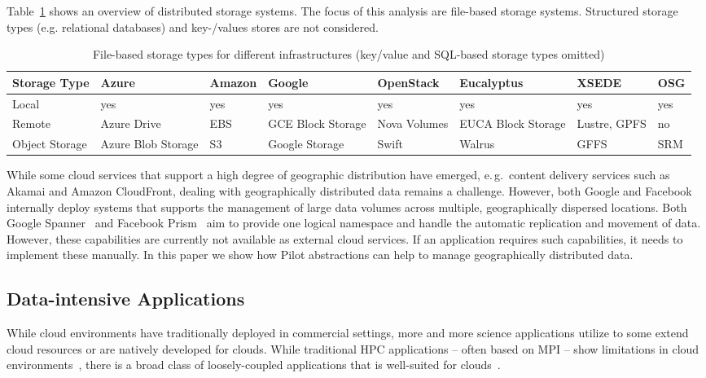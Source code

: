 \documentclass[times]{cpeauth}
\newcommand{\pilot}{Pilot\xspace}
\begin{document}
Table~\ref{tab:storage-systems} shows an overview of distributed storage 
systems. The focus of this analysis are file-based storage systems. Structured
storage types (e.g. relational databases) and key-/values stores are not 
considered.

\begin{table}[t]
\centering
\begin{tabular}{|p{1.7cm}|p{1.3cm}|p{1.3cm}|p{1.3cm}|p{1.4cm}|p{1.4cm}|p{1.3cm}|p{1.2cm}|}
	\hline
	\textbf{Storage Type} &\textbf{Azure} &\textbf{Amazon} &\textbf{Google} &\textbf{Open\-Stack} &\textbf{Euca\-lyptus} &\textbf{XSEDE}  &\textbf{OSG} \\
	\hline
	Local	&yes &yes &yes &yes &yes &yes &yes\\
	\hline
	Remote &Azure Drive &EBS &GCE Block Storage &Nova Volumes &EUCA Block Storage &Lustre, GPFS 
	&no\\
	\hline
	Object Storage &Azure Blob Storage &S3 &Google Storage &Swift & Walrus &GFFS
	 &SRM\\
	\hline	
\end{tabular}
\caption{File-based storage types for different infrastructures (key/value and 
SQL-based storage types omitted) \label{tab:storage-systems}}
\end{table}




While some cloud services that support a high degree of geographic
distribution have emerged, e.\,g.\ content delivery services such as
Akamai and Amazon CloudFront, dealing with geographically distributed
data remains a challenge. However, both Google and Facebook internally
deploy systems that supports the management of large data volumes
across multiple, geographically dispersed locations. Both Google
Spanner~\cite{dean09} and Facebook Prism~\cite{Metz12} aim to provide
one logical namespace and handle the automatic replication and
movement of data. However, these capabilities are currently not
available as external cloud services. If an application requires such
capabilities, it needs to implement these manually. In this paper we
show how \pilot abstractions can help to manage geographically
distributed data.


\subsection{Data-intensive Applications}

While cloud environments have traditionally deployed in commercial settings,
more and more science applications utilize to some extend cloud resources or
are natively developed for clouds. While traditional HPC applications -- often
based on MPI -- show limitations in cloud
environments~\cite{Evangelinos2008,Mehrotra:2012:PEA:2287036.2287045}, there
is a broad class of loosely-coupled applications that is well-suited for
clouds~\cite{1851544,Sehgal2011 590}.
\end{document}
